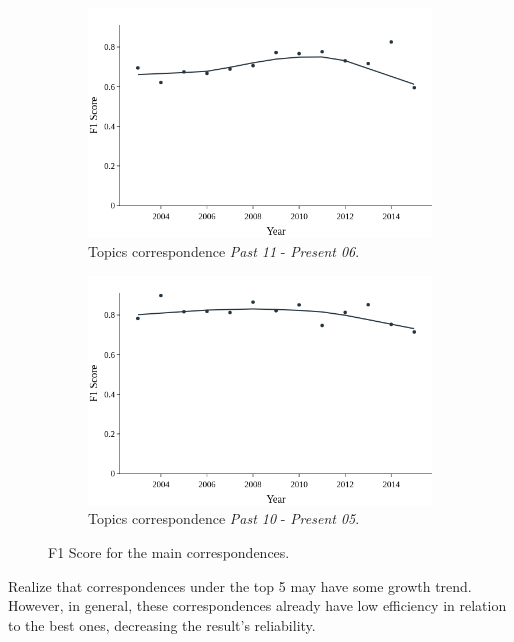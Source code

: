 \begin{figure}[h!]
	\begin{subfigure}{0.5\textwidth}
	\includegraphics[width=\linewidth]{01.Chapters/05.Results/lowess-1}
		\caption{Topics correspondence \textit{Past 11} - \textit{Present 06}.}
	\end{subfigure}%
	\hfill
	\begin{subfigure}{0.5\textwidth}
		\includegraphics[width=\linewidth]{01.Chapters/05.Results/lowess-2}
		\caption{Topics correspondence \textit{Past 10} - \textit{Present 05}.}
	\end{subfigure}%
	\caption{F1 Score for the main correspondences.}
	\label{fig:isolated-topics}
\end{figure}

\newpage
Realize that correspondences under the top 5 may have some growth trend. However, in general, these correspondences already have low efficiency in relation to the best ones, decreasing the result's reliability.



